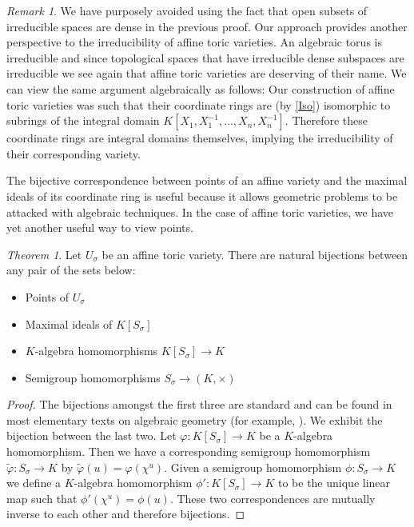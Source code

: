 \documentclass[BSc]{usydthesis}
\numberwithin{equation}{chapter}
\theoremstyle{remark}
\newtheorem{Theorem}[equation]{Theorem}
\newtheorem{Remark}[equation]{Remark}
\begin{document}
\begin{Remark} 
We have purposely avoided using the fact that open subsets of irreducible spaces are dense in the previous proof. Our approach provides another perspective to the irreducibility of affine toric varieties. An algebraic torus is irreducible and since topological spaces that have irreducible dense subspaces are irreducible we see again that affine toric varieties are deserving of their name. We can view the same argument algebraically as follows: Our construction of affine toric varieties was such that their coordinate rings are (by \ref{Iso}) isomorphic to subrings of the integral domain $K[X_1, X_1^{-1}, \ldots, X_n, X_n^{-1}].$ Therefore these coordinate rings are integral domains themselves, implying the irreducibility of their corresponding variety.
\end{Remark}
The bijective correspondence between points of an affine variety and the maximal ideals of its coordinate ring is useful because it allows geometric problems to be attacked with algebraic techniques. In the case of affine toric varieties, we have yet another useful way to view points. 

\begin{Theorem} \label{SemigroupPoints}
Let $U_{\sigma}$ be an affine toric variety. There are natural bijections between any pair of the sets below:
 
 \begin{itemize}
  \item Points of $U_{\sigma}$
  \item Maximal ideals of $K[S_{\sigma}]$
  \item $K$-algebra homomorphisms $K[S_{\sigma}]\to K$
  \item Semigroup homomorphisms $S_{\sigma} \to (K, \times)$
 \end{itemize}

\end{Theorem}

\begin{proof}
 The bijections amongst the first three are standard and can be found in most elementary texts on algebraic geometry (for example, \cite{Shafarevich1}). We exhibit the bijection between the last two. Let $\varphi: K[S_{\sigma}] \to K$ be a $K$-algebra homomorphism. Then we have a corresponding semigroup homomorphism $\tilde{\varphi}: S_{\sigma} \to K$ by $\tilde{\varphi}(u) = \varphi( \chi^u ).$ Given a semigroup homomorphism $\phi: S_{\sigma} \to K$ we define a $K$-algebra homomorphism $\phi': K[S_{\sigma}]\to K$ to be the unique linear map such that $\phi'(\chi^u) = \phi(u).$ These two correspondences are mutually inverse to each other and therefore bijections.  
\end{proof}
\end{document}

